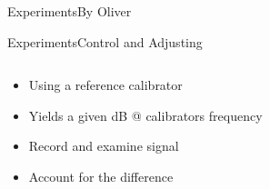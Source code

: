 \begin{frame}{Experiments}{By Oliver}
\begin{frame}{Experiments}{Control and Adjusting}		
	\begin{columns}
		\begin{column}{0.3\textwidth}
			\begin{itemize}
				\item Using a reference calibrator
				\item Yields a given dB @ calibrators frequency
				\item Record and examine signal
				\item Account for the difference 
			\end{itemize}	
		\end{column}	
		\begin{column}{0.7\textwidth} 
			\begin{figure}
				
			\end{figure}
		\end{column}
	\end{columns}
\end{frame}


\end{frame}
